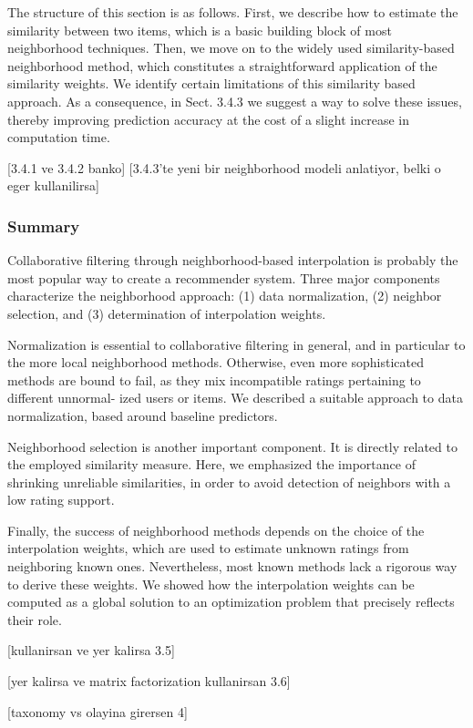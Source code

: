 The structure of this section is as follows. First, we describe how to estimate the similarity between two items, which is a basic building block of most neighborhood techniques. Then, we move on to the widely used similarity-based neighborhood method, which constitutes a straightforward application of the similarity weights. We identify certain limitations of this similarity based approach. As a consequence, in Sect. 3.4.3 we suggest a way to solve these issues, thereby improving prediction accuracy at the cost of a slight increase in computation time.

[3.4.1 ve 3.4.2 banko]
[3.4.3'te yeni bir neighborhood modeli anlatiyor, belki o eger kullanilirsa]

\subsubsection{Summary}


Collaborative filtering through neighborhood-based interpolation is probably the most popular way to create a recommender system. Three major components characterize the neighborhood approach: (1) data normalization, (2) neighbor selection, and (3) determination of interpolation weights.

Normalization is essential to collaborative filtering in general, and in particular to the more local neighborhood methods. Otherwise, even more sophisticated methods are bound to fail, as they mix incompatible ratings pertaining to different unnormal- ized users or items. We described a suitable approach to data normalization, based around baseline predictors.

Neighborhood selection is another important component. It is directly related to the employed similarity measure. Here, we emphasized the importance of shrinking unreliable similarities, in order to avoid detection of neighbors with a low rating support.

Finally, the success of neighborhood methods depends on the choice of the interpolation weights, which are used to estimate unknown ratings from neighboring known ones. Nevertheless, most known methods lack a rigorous way to derive these weights. We showed how the interpolation weights can be computed as a global solution to an optimization problem that precisely reflects their role.

[kullanirsan ve yer kalirsa 3.5]

[yer kalirsa ve matrix factorization kullanirsan 3.6]

[taxonomy vs olayina girersen 4]